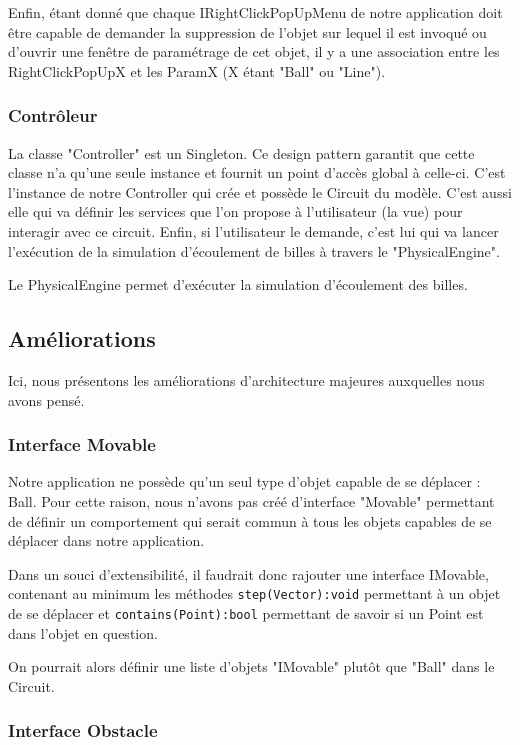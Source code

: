 \documentclass{report}
\begin{document}
Enfin, étant donné que chaque IRightClickPopUpMenu de notre application doit être capable de demander la suppression de l'objet sur lequel il est invoqué ou d'ouvrir une fenêtre de paramétrage de cet objet, il y a une association entre les RightClickPopUpX et les ParamX (X étant "Ball" ou "Line").

\subsubsection{Contrôleur}

La classe "Controller" est un Singleton. Ce design pattern garantit que cette classe n'a qu'une seule instance et fournit un point d'accès global à celle-ci. C'est l'instance de notre Controller qui crée et possède le Circuit du modèle. C'est aussi elle qui va définir les services que l'on propose à l'utilisateur (la vue) pour interagir avec ce circuit. Enfin, si l'utilisateur le demande, c'est lui qui va lancer l'exécution de la simulation d'écoulement de billes à travers le "PhysicalEngine".

Le PhysicalEngine permet d'exécuter la simulation d'écoulement des billes.

\subsection{Améliorations}

Ici, nous présentons les améliorations d'architecture majeures auxquelles nous avons pensé.

\subsubsection{Interface Movable}

Notre application ne possède qu'un seul type d'objet capable de se déplacer : Ball. Pour cette raison, nous n'avons pas créé d'interface "Movable" permettant de définir un comportement qui serait commun à tous les objets capables de se déplacer dans notre application. 

Dans un souci d'extensibilité, il faudrait donc rajouter une interface IMovable, contenant au minimum les méthodes \texttt{step(Vector):void} permettant à un objet de se déplacer et \texttt{contains(Point):bool} permettant de savoir si un Point est dans l'objet en question.

On pourrait alors définir une liste d'objets "IMovable" plutôt que "Ball" dans le Circuit.

\subsubsection{Interface Obstacle}
\end{document}
